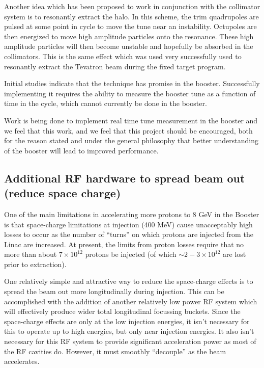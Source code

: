 \documentclass{article}
\begin{document}
Another idea which has been proposed to work in conjunction with
the collimator system is to resonantly extract the halo.  In this
scheme, the trim quadrupoles are pulsed at some point in cycle to 
move the tune near an instability.  Octupoles are then energized to
move high amplitude particles onto the resonance.  These high amplitude
particles will then become unstable and hopefully be absorbed in the
collimators.  This is the same effect which was used very successfully
used to resonantly extract the Tevatron beam during the fixed target
program.

Initial studies indicate that the technique has promise in the booster.
Successfully implementing it requires the ability to measure the booster
tune as a function of time in the cycle, which cannot currently be
done in the booster.  

Work is being done to implement real time tune measurement in the
booster and we feel that this work, and we feel that this project
should be encouraged, both for the reason stated and under the
general philosophy that better understanding of the booster will
lead to improved performance.


\subsection {Additional RF hardware to spread beam out (reduce space charge)}

   One of the main limitations in accelerating more protons to 8 GeV in the
Booster is that space-charge limitations at injection (400 MeV) cause 
unacceptably high losses to occur as the number of ``turns'' on which 
protons are injected from the Linac are increased. At present, the limits
from proton losses require that no more than about $7 \times 10^{12}$
protons be injected (of which $\sim 2-3 \times 10^{12}$ are lost prior to
extraction).

One relatively simple and attractive way to reduce the
space-charge effects is to spread the beam out more longitudinally
during injection. This
can be accomplished with the addition of another relatively low power RF
system which will effectively produce wider total longitudinal focussing
buckets. Since the space-charge effects are only at the low injection
energies, it isn't necessary for this to operate up to high energies, but
only near injection energies. It also isn't necessary for this RF system
to provide significant acceleration power as most of the RF cavities do. 
However, it must smoothly ``decouple'' as the beam accelerates. 
\end{document}
